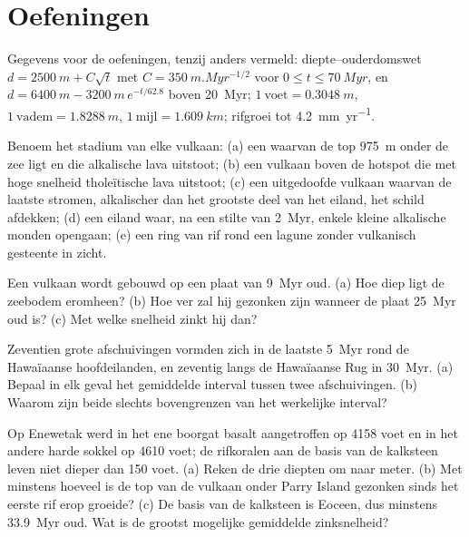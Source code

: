 \section*{Oefeningen}\label{sec:b2:oceanic-islands:exercises}

Gegevens voor de oefeningen, tenzij anders vermeld: diepte--ouderdomswet $d = \qty{2500}{m} + C\sqrt t$ met
$C = \qty{350}{m.Myr^{-1/2}}$ voor $0 \le t \le \qty{70}{Myr}$, en $d = \qty{6400}{m} -
\qty{3200}{m}\,e^{-t/62.8}$ boven \qty{20}{Myr}; $1~\text{voet} = \qty{0.3048}{m}$, $1~\text{vadem}
= \qty{1.8288}{m}$, $1~\text{mijl} = \qty{1.609}{km}$; rifgroei tot \qty{4.2}{mm.yr^{-1}}.

\begin{exercise}[$\star$]\label{exo:b2:oceanic-islands:1}
Benoem het stadium van elke vulkaan: (a) een  waarvan de top \qty{975}{m} onder de zee ligt en die
alkalische lava uitstoot; (b) een vulkaan boven de hotspot die met hoge snelheid tholeïtische lava uitstoot; (c) een
uitgedoofde vulkaan waarvan de laatste stromen, alkalischer dan het grootste deel van het eiland, het schild afdekken; (d) een
eiland waar, na een stilte van \qty{2}{Myr}, enkele kleine alkalische monden opengaan; (e) een ring van rif
rond een lagune zonder vulkanisch gesteente in zicht.
\end{exercise}

\begin{exercise}[$\star$]\label{exo:b2:oceanic-islands:2}
Een vulkaan wordt gebouwd op een plaat van \qty{9}{Myr} oud. (a) Hoe diep ligt de zeebodem eromheen? (b) Hoe
ver zal hij gezonken zijn wanneer de plaat \qty{25}{Myr} oud is? (c) Met welke snelheid zinkt hij dan?
\end{exercise}

\begin{exercise}[$\star$]\label{exo:b2:oceanic-islands:3}
Zeventien grote afschuivingen vormden zich in de laatste \qty{5}{Myr} rond de Hawaïaanse hoofdeilanden, en
zeventig langs de Hawaïaanse Rug in \qty{30}{Myr}. (a) Bepaal in elk geval het gemiddelde interval tussen twee afschuivingen.
(b) Waarom zijn beide slechts bovengrenzen van het werkelijke interval?
\end{exercise}

\begin{exercise}[$\star$]\label{exo:b2:oceanic-islands:4}
Op Enewetak werd in het ene boorgat basalt aangetroffen op 4158 voet en in het andere harde sokkel op 4610 voet;
de rifkoralen aan de basis van de kalksteen leven niet dieper dan 150 voet. (a) Reken
de drie diepten om naar meter. (b) Met minstens hoeveel is de top van de vulkaan onder Parry Island
gezonken sinds het eerste rif erop groeide? (c) De basis van de kalksteen is Eoceen, dus minstens
\qty{33.9}{Myr} oud. Wat is de grootst mogelijke gemiddelde zinksnelheid?
\end{exercise}

